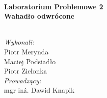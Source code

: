 \begin{titlepage}

\HRule \\[0.4cm]
{ \huge \bfseries Laboratorium Problemowe 2\\[1cm]Wahadło odwrócone}\\[0.4cm] %
\HRule \\[2.5cm]
 






\begin{flushleft}
\Large
\emph{Wykonali:}\\
Piotr Merynda\\
Maciej Podsiadło\\
Piotr Zielonka\\[1cm]

 \emph{Prowadzący:}\\
mgr inż. Dawid Knapik\\[3cm] %
 
\end{flushleft}
\end{titlepage}
\clearpage
\setcounter{page}{2}